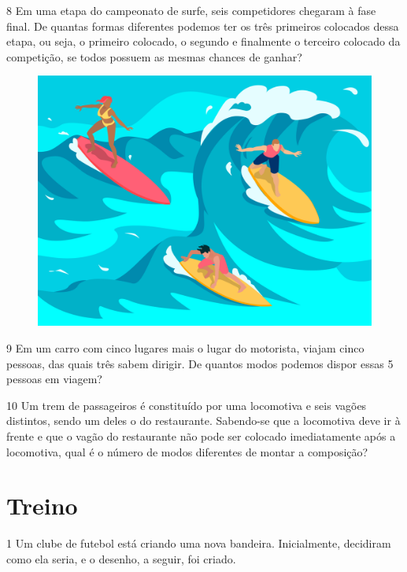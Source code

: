 \num{8} Em uma etapa do campeonato de surfe, seis competidores chegaram à fase
final. De quantas formas diferentes podemos ter os três primeiros
colocados dessa etapa, ou seja, o primeiro colocado, o segundo e
finalmente o terceiro colocado da competição, se todos
possuem as mesmas chances de ganhar?

\begin{figure}[htpb!]
\centering
\includegraphics[width=.6\textwidth]{media/image73b.jpeg}
\end{figure}


\num{9} Em um carro com cinco lugares mais o lugar do motorista, viajam cinco pessoas,
das quais três sabem dirigir. De quantos modos podemos dispor essas 5
pessoas em viagem?


\num{10} Um trem de passageiros é constituído por uma locomotiva e seis vagões
distintos, sendo um deles o do restaurante. Sabendo-se que a locomotiva deve ir
à frente e que o vagão do restaurante não pode ser colocado imediatamente
após a locomotiva, qual é o número de modos diferentes de montar a
composição?


\pagebreak
\section*{Treino}

\num{1} Um clube de futebol está criando uma nova bandeira.
Inicialmente, decidiram como ela seria, e o desenho, a seguir, foi criado.

